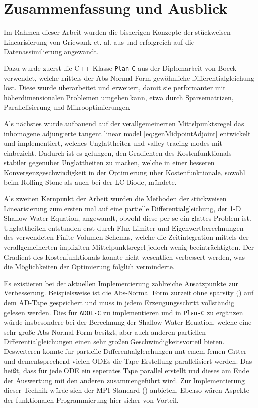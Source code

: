 \chapter{Zusammenfassung und Ausblick}

Im Rahmen dieser Arbeit wurden die bisherigen Konzepte der stückweisen Linearisierung von Griewank et. al. aus \cite{monster} und \cite{plan} erfolgreich auf die Datenassimilierung angewandt.

Dazu wurde zuerst die C++ Klasse \texttt{Plan-C} aus der Diplomarbeit von Boeck \cite{boeck14} verwendet, welche mittels der Abs-Normal Form gewöhnliche Differentialgleichung löst. Diese wurde überarbeitet und erweitert, damit sie performanter mit höherdimensionalen Problemen umgehen kann, etwa durch Sparsematrizen, Parallelisierung und Mikrooptimierungen. 

Als nächstes wurde aufbauend auf der verallgemeinerten Mittelpunktsregel das inhomogene adjungierte tangent linear model \eqref{eq:genMidpointAdjoint} entwickelt und implementiert, welches Unglattheiten und valley tracing modes mit einbezieht. Dadurch ist es gelungen, den Gradienten des Kostenfunktionals stabiler gegenüber Unglattheiten zu machen, welche in einer besseren Konvergenzgeschwindigkeit in der Optimierung über Kostenfunktionale, sowohl beim Rolling Stone als auch bei der LC-Diode, mündete.

Als zweiten Kernpunkt der Arbeit wurden die Methoden der stückweisen Linearisierung zum ersten mal auf eine partielle Differentialgleichung, der 1-D Shallow Water Equation, angewandt, obwohl diese per se ein glattes Problem ist. Unglattheiten entstanden erst durch Flux Limiter und Eigenwertberechnungen des verwendeten Finite Volumen Schemas, welche die Zeitintegration mittels der verallgemeinerten impliziten Mittelpunktsregel jedoch wenig beeinträchtigten.
Der Gradient des Kostenfunktionals konnte nicht wesentlich verbessert werden, was die Möglichkeiten der Optimierung folglich verminderte.

Es existieren bei der aktuellen Implementierung zahlreiche Ansatzpunkte zur Verbesserung. Beispielsweise ist die Abs-Normal Form zurzeit ohne sparsity (\cite[S.137 ff.]{griewank2008evaluating}) auf dem AD-Tape gespeichert und muss in jedem Erzeugungsschritt vollständig gelesen werden. Dies für \texttt{ADOL-C} zu implementieren und in \texttt{Plan-C} zu ergänzen  würde insbesondere bei der Berechnung der Shallow Water Equation, welche eine sehr große Abs-Normal Form besitzt, aber auch anderen partiellen Differentialgleichungen einen sehr großen Geschwindigkeitsvorteil bieten. 
Desweiteren könnte für partielle Differentialgleichungen mit einem feinen Gitter und dementsprechend vielen ODEs die Tape Erstellung parallelisiert werden. Das heißt, dass für jede ODE ein seperates Tape parallel erstellt und dieses am Ende der Auswertung mit den anderen zusammengeführt wird. Zur Implementierung dieser Technik würde sich der MPI Standard (\cite{mpi}) anbieten. Ebenso wären Aspekte der funktionalen Programmierung hier sicher von Vorteil.

